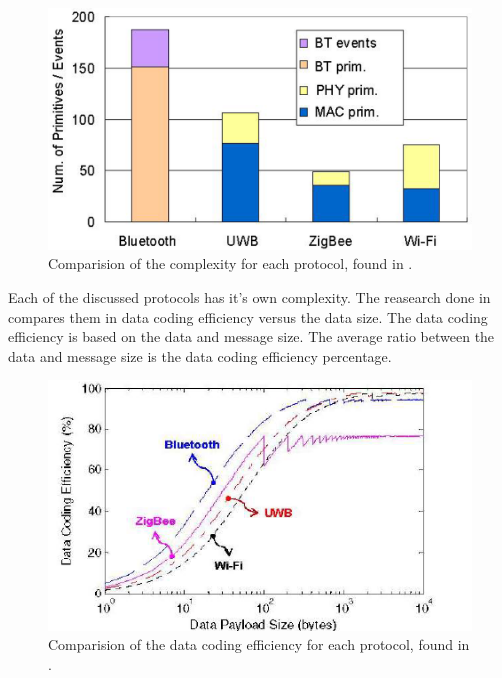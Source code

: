 \documentclass[10pt,a4paper]{article}
\begin{document}
\begin{figure}[H]
   \centering
   \includegraphics[width=1\textwidth]{protocolcomplexity}
   \caption{Comparision of the complexity for each protocol, found in \cite{comparitivestudywirelessprotocols}.}
   \label{fig:protocolcomplexity}
\end{figure}

Each of the discussed protocols has it's own complexity. The reasearch done in \cite{comparitivestudywirelessprotocols} compares them in data coding efficiency versus the data size. The data coding efficiency is based on the data and message size. The average ratio between the data and message size is the data coding efficiency percentage. 

\begin{figure}[H]
   \centering
   \includegraphics[width=1\textwidth]{datacodingefficieny}
   \caption{Comparision of the data coding efficiency for each protocol, found in \cite{comparitivestudywirelessprotocols}.}
   \label{fig:protocolefficiency}
\end{figure}
\end{document}
